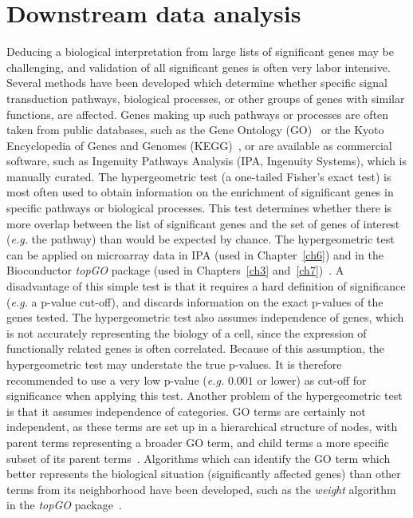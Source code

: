%
\section{Downstream data analysis}\label{downstream1}
Deducing a biological interpretation from large lists of significant genes may be challenging, and validation of all significant genes is often very labor intensive. Several methods have been developed which determine whether specific signal transduction pathways, biological processes, or other groups of genes with similar functions, are affected. Genes making up such pathways or processes are often taken from public databases, such as the Gene Ontology (GO)~\cite{ashburner2000gene} or the Kyoto Encyclopedia of Genes and Genomes (KEGG)~\cite{kanehisa2000kegg}, or are available as commercial software, such as Ingenuity Pathways Analysis (IPA, Ingenuity Systems), which is manually curated. The hypergeometric test (a one\hyp{}tailed Fisher's exact test) is most often used to obtain information on the enrichment of significant genes in specific pathways or biological processes. This test determines whether there is more overlap between the list of significant genes and the set of genes of interest ({\it e.g.} the pathway) than would be expected by chance. The hypergeometric test can be applied on microarray data in IPA (used in Chapter~\ref{ch6}) and in the Bioconductor {\it topGO} package (used in Chapters~\ref{ch3} and~\ref{ch7})~\cite{alexa2006improved}. A disadvantage of this simple test is that it requires a hard definition of significance ({\it e.g.} a p-value cut-off), and discards information on the exact p-values of the genes tested. The hypergeometric test also assumes independence of genes, which is not accurately representing the biology of a cell, since the expression of functionally related genes is often correlated. Because of this assumption, the hypergeometric test may understate the true p-values. It is therefore recommended to use a very low p-value ({\it e.g.} $0.001$ or lower) as cut-off for significance when applying this test. Another problem of the hypergeometric test is that it assumes independence of categories. GO terms are certainly not independent, as these terms are set up in a hierarchical structure of nodes, with parent terms representing a broader GO term, and child terms a more specific subset of its parent terms~\cite{ashburner2000gene,rhee2008use}. Algorithms which can identify the GO term which better represents the biological situation (significantly affected genes) than other terms from its neighborhood have been developed, such as the {\it weight} algorithm in the {\it topGO} package~\cite{alexa2006improved}.

